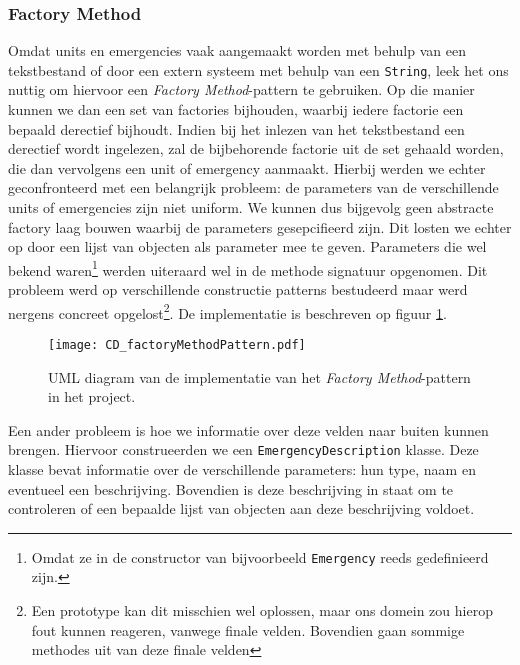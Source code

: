 \subsubsection{Factory Method}
Omdat units en emergencies vaak aangemaakt worden met behulp van een tekstbestand of door een extern systeem met behulp van een \verb+String+, leek het ons nuttig om hiervoor een \textit{Factory Method}-pattern te gebruiken. Op die manier kunnen we dan een set van factories bijhouden, waarbij iedere factorie een bepaald derectief bijhoudt. Indien bij het inlezen van het tekstbestand een derectief wordt ingelezen, zal de bijbehorende factorie uit de set gehaald worden, die dan vervolgens een unit of emergency aanmaakt. Hierbij werden we echter geconfronteerd met een belangrijk probleem: de parameters van de verschillende units of emergencies zijn niet uniform. We kunnen dus bijgevolg geen abstracte factory laag bouwen waarbij de parameters gesepcifieerd zijn. Dit losten we echter op door een lijst van objecten als parameter mee te geven. Parameters die wel bekend waren\footnote{Omdat ze in de constructor van bijvoorbeeld \verb+Emergency+ reeds gedefinieerd zijn.} werden uiteraard wel in de methode signatuur opgenomen. Dit probleem werd op verschillende constructie patterns bestudeerd maar werd nergens concreet opgelost\footnote{Een prototype kan dit misschien wel oplossen, maar ons domein zou hierop fout kunnen reageren, vanwege finale velden. Bovendien gaan sommige methodes uit van deze finale velden}. De implementatie is beschreven op figuur \ref{fig:factoryMethodPattern}.
\begin{figure}[thtb]
\texttt{[image: CD\_factoryMethodPattern.pdf]}
\caption{UML diagram van de implementatie van het \textit{Factory Method}-pattern in het project.}
\label{fig:factoryMethodPattern}
\end{figure}
Een ander probleem is hoe we informatie over deze velden naar buiten kunnen brengen. Hiervoor construeerden we een \verb+EmergencyDescription+ klasse. Deze klasse bevat informatie over de verschillende parameters: hun type, naam en eventueel een beschrijving. Bovendien is deze beschrijving in staat om te controleren of een bepaalde lijst van objecten aan deze beschrijving voldoet.